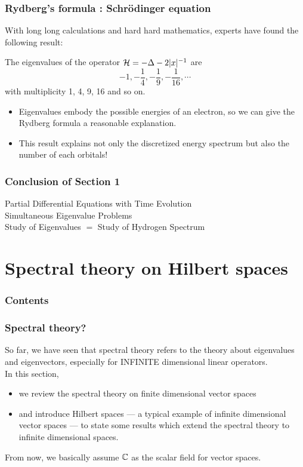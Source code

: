 \documentclass{beamer}
\begin{document}
\begin{frame}
\frametitle{Rydberg's formula : Schr\"odinger equation}
  With long long calculations and hard hard mathematics, experts have found the following result: \pause
  \begin{prop}
    The eigenvalues of the operator $\mathcal{H}=-\Delta-2|x|^{-1}$ are \pause
    \[-1,-\frac14,-\frac19,-\frac1{16},\cdots\]
    \pause with multiplicity 1, 4, 9, 16 and so on.
  \end{prop}
  \begin{itemize}[<+->]
    \item Eigenvalues embody the possible energies of an electron, so we can give the Rydberg formula a reasonable explanation.
    \item This result explains not only the discretized energy spectrum but also the number of each orbitals!
  \end{itemize}
\end{frame}

\begin{frame}
\frametitle{Conclusion of Section 1}
  \begin{rd}
  Partial Differential Equations with Time Evolution \\
  Simultaneous Eigenvalue Problems  \\
  Study of Eigenvalues $=$ Study of Hydrogen Spectrum
  \end{rd}
\end{frame}

\section{Spectral theory on Hilbert spaces}
\begin{frame}
\frametitle{Contents}
  \tableofcontents[currentsection]
\end{frame}

\begin{frame}
\frametitle{Spectral theory?}
  So far, we have seen that spectral theory refers to the theory about eigenvalues and eigenvectors, \pause especially for INFINITE dimensional linear operators.\\
  \pause In this section,
  \begin{itemize}
    \item we review the spectral theory on finite dimensional vector spaces
    \item and introduce Hilbert spaces --- a typical example of infinite dimensional vector spaces --- to state some results which extend the spectral theory to infinite dimensional spaces.
  \end{itemize}
  \pause From now, we basically assume $\mathbb{C}$ as the scalar field for vector spaces.
\end{frame}
\end{document}
